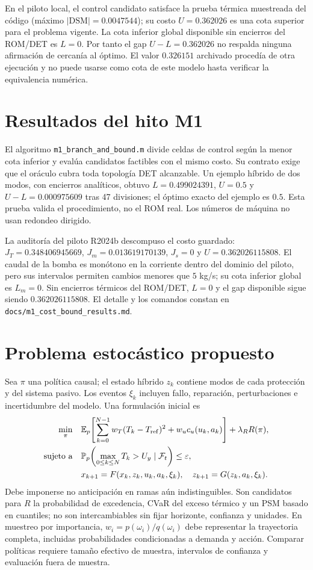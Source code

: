 \documentclass[11pt,a4paper]{article}
\newcommand{\E}{\mathbb E}
\newcommand{\Prob}{\mathbb P}
\begin{document}
En el piloto local, el control candidato satisface la prueba
térmica muestreada del código (máximo $|\mathrm{DSM}|=0.0047544$);
su costo $U=0.362026$ es una cota superior para el problema vigente.
La cota inferior global disponible sin encierros del ROM/DET es
$L=0$. Por tanto el gap $U-L=0.362026$ no respalda ninguna
afirmación de cercanía al óptimo. El valor $0.326151$ archivado
procedía de otra ejecución y no puede usarse como cota de este
modelo hasta verificar la equivalencia numérica.

\section{Resultados del hito M1}
El algoritmo \texttt{m1\_branch\_and\_bound.m} divide celdas de control
según la menor cota inferior y evalúa candidatos factibles con el mismo
costo. Su contrato exige que el oráculo cubra toda topología DET alcanzable.
Un ejemplo híbrido de dos modos, con encierros analíticos, obtuvo
$L=0.499024391$, $U=0.5$ y $U-L=0.000975609$ tras 47 divisiones;
el óptimo exacto del ejemplo es $0.5$. Esta prueba valida el procedimiento,
no el ROM real. Los números de máquina no usan redondeo dirigido.

La auditoría del piloto R2024b descompuso el costo guardado:
$J_T=0.348406945669$, $J_m=0.013619170139$,
$J_s=0$ y $U=0.362026115808$. El caudal de la bomba es
monótono en la corriente dentro del dominio del piloto, pero sus
intervalos permiten cambios menores que $5$ kg/s; su cota inferior
global es $L_m=0$. Sin encierros térmicos del ROM/DET,
$L=0$ y el gap disponible sigue siendo $0.362026115808$.
El detalle y los comandos constan en
\texttt{docs/m1\_cost\_bound\_results.md}.

\section{Problema estocástico propuesto}
Sea $\pi$ una política causal; el estado híbrido $z_k$ contiene modos
de cada protección y del sistema pasivo. Los eventos $\xi_k$ incluyen
fallo, reparación, perturbaciones e incertidumbre del modelo.
Una formulación inicial es
\begin{align}
\min_{\pi}\quad&
\E_p\!\left[\sum_{k=0}^{N-1}
 w_T(T_k-T_{\rm ref})^2+w_u c_u(u_k,a_k)\right]
+\lambda_R R(\pi),\\
\text{sujeto a}\quad&
\Prob_p\!\left(\max_{0\leq k\leq N}T_k>U_y
\mid\mathcal F_t\right)\leq\varepsilon,\\
&x_{k+1}=F(x_k,z_k,u_k,a_k,\xi_k),\quad
z_{k+1}=G(z_k,a_k,\xi_k).
\end{align}
Debe imponerse no anticipación en ramas aún indistinguibles.
Son candidatos para $R$ la probabilidad de excedencia, CVaR del exceso
térmico y un PSM basado en cuantiles; no son intercambiables sin fijar
horizonte, confianza y unidades. En muestreo por importancia,
$w_i=p(\omega_i)/q(\omega_i)$ debe representar la trayectoria completa,
incluidas probabilidades condicionadas a demanda y acción. Comparar
políticas requiere tamaño efectivo de muestra, intervalos de confianza
y evaluación fuera de muestra.
\end{document}
